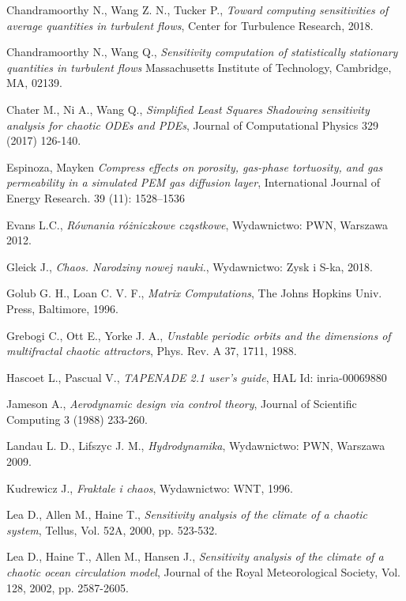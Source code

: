 \documentclass[12pt]{article}
\begin{document}
\begin{thebibliography}{99}
 Chandramoorthy N., Wang Z. N., Tucker P.,
\emph{Toward computing sensitivities of average
quantities in turbulent flows},
Center for Turbulence Research, 2018.

 Chandramoorthy N., Wang Q.,
\emph{Sensitivity computation of statistically stationary quantities in turbulent flows}
Massachusetts Institute of Technology, Cambridge, MA, 02139.

 Chater M., Ni A., Wang Q., 
\emph{Simplified Least Squares Shadowing sensitivity analysis for chaotic ODEs and PDEs},
Journal of Computational Physics 329 (2017) 126-140.

 Espinoza, Mayken 
\emph{Compress effects on porosity, gas-phase tortuosity, and gas permeability in a simulated PEM gas diffusion layer},
International Journal of Energy Research. 39 (11): 1528–1536

 Evans L.C.,
\emph{Równania różniczkowe cząstkowe},
Wydawnictwo: PWN, Warszawa 2012.

 Gleick J.,
\emph{Chaos. Narodziny nowej nauki.},
Wydawnictwo: Zysk i S-ka, 2018.

 Golub G. H., Loan C. V. F.,
\emph{Matrix Computations},
The Johns Hopkins Univ. Press, Baltimore, 1996.

 Grebogi C., Ott E., Yorke J. A.,   
\emph{Unstable periodic orbits and the dimensions of multifractal chaotic attractors},
Phys. Rev. A 37, 1711, 1988.

 Hascoet L., Pascual V.,
\emph{TAPENADE 2.1 user’s guide},
HAL Id: inria-00069880

 Jameson A.,
\emph{Aerodynamic design via control theory},
Journal of Scientific Computing 3 (1988) 233-260.

 Landau L. D., Lifszyc J. M.,
\emph{Hydrodynamika},
Wydawnictwo: PWN, Warszawa 2009.

 Kudrewicz J., 
\emph{Fraktale i chaos},
Wydawnictwo: WNT, 1996.

 Lea D., Allen M., Haine T.,
\emph{Sensitivity analysis of the climate of a chaotic system},
Tellus, Vol. 52A, 2000, pp. 523-532.

 Lea D., Haine T., Allen M., Hansen J., 
\emph{Sensitivity analysis of the climate of a chaotic ocean circulation model},
Journal of the Royal Meteorological Society, Vol. 128, 2002, pp. 2587-2605.


\end{thebibliography}
\end{document}
